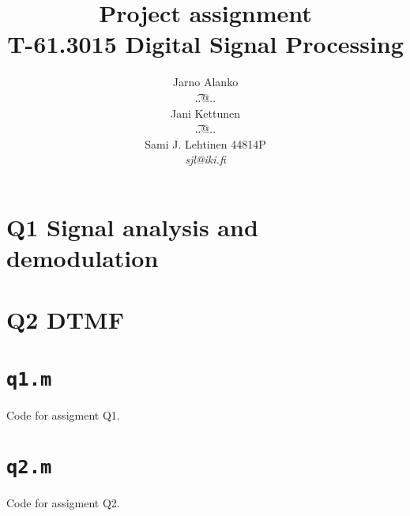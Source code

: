 \documentclass[a4paper]{article}
\begin{document}
\title{Project assignment \\
T-61.3015 Digital Signal Processing}
\author{Jarno Alanko \\
  {\t ..@..} \\
  Jani Kettunen \\
  {\t ..@..} \\
  Sami J. Lehtinen 44814P  \\ 
       {\it sjl@iki.fi}}

\maketitle             
\thispagestyle{empty}
\newpage
{}
\setcounter{page}{2}

\section*{Q1 Signal analysis and demodulation }


\section*{Q2 DTMF}


\clearpage




\newpage
\appendix
\section{{\tt q1.m}}
\label{sect:q1m}
Code for assigment Q1.



\newpage
\section{{\tt q2.m}}
\label{sect:q2m}
Code for assigment Q2.


\end{document}
